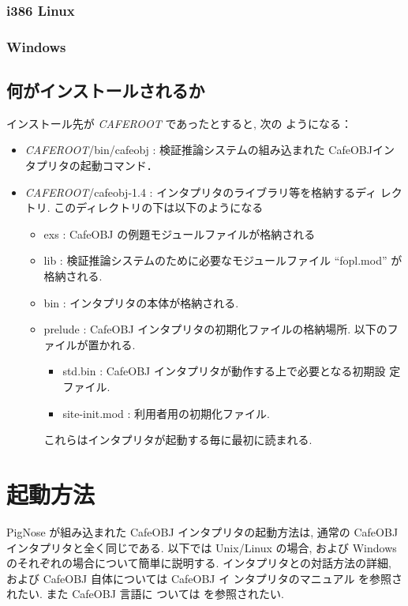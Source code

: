 \subsubsection{i386 Linux}

\subsubsection{Windows}

\subsection{何がインストールされるか}
  インストール先が \emph{CAFEROOT} であったとすると, 次の
  ようになる：
  \begin{itemize}
  \item \emph{CAFEROOT}/bin/cafeobj : 検証推論システムの組み込まれた
    CafeOBJインタプリタの起動コマンド．
  \item \emph{CAFEROOT}/cafeobj-1.4 : インタプリタのライブラリ等を格納するディ
    レクトリ. 
    このディレクトリの下は以下のようになる
    \begin{itemize}
    \item exs : CafeOBJ の例題モジュールファイルが格納される
    \item lib : 検証推論システムのために必要なモジュールファイル
      ``fopl.mod'' が格納される.
    \item bin : インタプリタの本体が格納される.
    \item prelude : CafeOBJ インタプリタの初期化ファイルの格納場所. 
      以下のファイルが置かれる.
      \begin{itemize}
      \item std.bin : CafeOBJ インタプリタが動作する上で必要となる初期設
        定ファイル. 
      \item site-init.mod : 利用者用の初期化ファイル. 
      \end{itemize}
      これらはインタプリタが起動する毎に最初に読まれる.
    \end{itemize}
  \end{itemize}


\section{起動方法}
PigNose が組み込まれた CafeOBJ インタプリタの起動方法は, 通常の
CafeOBJ インタプリタと全く同じである. 以下では Unix/Linux の場合, および
Windowsのそれぞれの場合について簡単に説明する. 
インタプリタとの対話方法の詳細, および CafeOBJ 自体については CafeOBJ イ
ンタプリタのマニュアル \cite{cafeobj}を参照されたい. また CafeOBJ 言語に
ついては \cite{CafeRep}を参照されたい.


